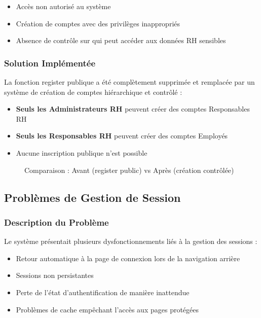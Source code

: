 \documentclass[12pt,a4paper]{article}
\begin{document}
\begin{itemize}
    \item Accès non autorisé au système
    \item Création de comptes avec des privilèges inappropriés
    \item Absence de contrôle sur qui peut accéder aux données RH sensibles
\end{itemize}

\subsubsection{Solution Implémentée}
La fonction register publique a été complètement supprimée et remplacée par un système de création de comptes hiérarchique et contrôlé :

\begin{itemize}
    \item \textbf{Seuls les Administrateurs RH} peuvent créer des comptes Responsables RH
    \item \textbf{Seuls les Responsables RH} peuvent créer des comptes Employés
    \item Aucune inscription publique n'est possible
\end{itemize}

\begin{figure}[H]
    \centering
    \caption{Comparaison : Avant (register public) vs Après (création contrôlée)}
    \label{fig:securite_avant_apres}
\end{figure}

\subsection{Problèmes de Gestion de Session}

\subsubsection{Description du Problème}
Le système présentait plusieurs dysfonctionnements liés à la gestion des sessions :

\begin{itemize}
    \item Retour automatique à la page de connexion lors de la navigation arrière
    \item Sessions non persistantes
    \item Perte de l'état d'authentification de manière inattendue
    \item Problèmes de cache empêchant l'accès aux pages protégées
\end{itemize}
\end{document}
